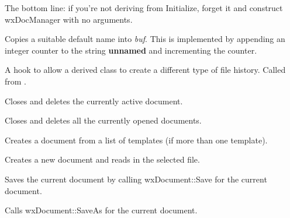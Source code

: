 The bottom line: if you're not deriving from Initialize, forget it and
construct wxDocManager with no arguments.



Copies a suitable default name into {\it buf}. This is implemented by
appending an integer counter to the string {\bf unnamed} and incrementing
the counter.



A hook to allow a derived class to create a different type of file history. Called
from .



Closes and deletes the currently active document.



Closes and deletes all the currently opened documents.



Creates a document from a list of templates (if more than one template).



Creates a new document and reads in the selected file.



Saves the current document by calling wxDocument::Save for the current document.



Calls wxDocument::SaveAs for the current document.



